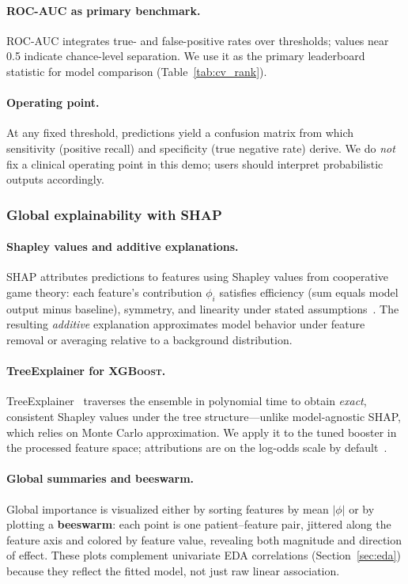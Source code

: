 \documentclass[11pt,a4paper]{article}
\begin{document}
\paragraph{ROC-AUC as primary benchmark.}
ROC-AUC integrates true- and false-positive rates over thresholds; values near \num{0.5} indicate chance-level separation. We use it as the primary leaderboard statistic for model comparison (Table~\ref{tab:cv_rank}).

\paragraph{Operating point.}
At any fixed threshold, predictions yield a confusion matrix from which sensitivity (positive recall) and specificity (true negative rate) derive. We do \emph{not} fix a clinical operating point in this demo; users should interpret probabilistic outputs accordingly.

\subsubsection{Global explainability with SHAP}
\label{sec:shap_global}

\paragraph{Shapley values and additive explanations.}
SHAP attributes predictions to features using Shapley values from cooperative game theory: each feature's contribution $\phi_i$ satisfies efficiency (sum equals model output minus baseline), symmetry, and linearity under stated assumptions~\cite{lundberg}. The resulting \emph{additive} explanation approximates model behavior under feature removal or averaging relative to a background distribution.

\paragraph{TreeExplainer for \textsc{XGBoost}.}
TreeExplainer~\cite{lundberg2018tree} traverses the ensemble in polynomial time to obtain \emph{exact}, consistent Shapley values under the tree structure—unlike model-agnostic SHAP, which relies on Monte Carlo approximation. We apply it to the tuned booster in the processed feature space; attributions are on the log-odds scale by default~\cite{lundberg}.

\paragraph{Global summaries and beeswarm.}
Global importance is visualized either by sorting features by mean $|\phi|$ or by plotting a \textbf{beeswarm}: each point is one patient--feature pair, jittered along the feature axis and colored by feature value, revealing both magnitude and direction of effect. These plots complement univariate EDA correlations (Section~\ref{sec:eda}) because they reflect the fitted model, not just raw linear association.
\end{document}
